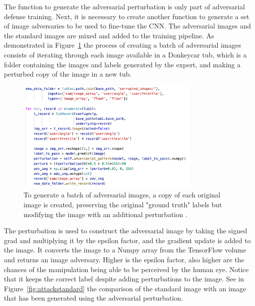 \documentclass[12pt]{article}
\begin{document}
The function to generate the adversarial perturbation is only part of adversarial defense training. Next, it is necessary to create another function to generate a set of image adversaries to be used to fine-tune the CNN. The adversarial images and the standard images are mixed and added to the training pipeline. As demonstrated in Figure~\ref{fig:batchadv} the process of creating a batch of adversarial images consists of iterating through each image available in a Donkeycar tub, which is a folder containing the images and labels generated by the expert, and making a perturbed copy of the image in a new tub.

\begin{figure} [H] %
\begin{center}
\includegraphics[width=0.8\textwidth]{figures/batch-adversarial.png}
\caption{ To generate a batch of adversarial images, a copy of each original image is created, preserving the original "ground truth" labels but modifying the image with an additional perturbation \parencite{Rosebrock}.}
\label{fig:batchadv}
\end{center}
\end{figure}

The perturbation is used to construct the adversarial image by taking the signed grad and multiplying it by the epsilon factor, and the gradient update is added to the image. It converts the image to a Numpy array from the TensorFlow volume and returns an image adversary. Higher is the epsilon factor, also higher are the chances of the manipulation being able to be perceived by the human eye. Notice that it keeps the correct label despite adding perturbations to the image. See in Figure~\ref{fig:attackstandard} the comparison of the standard image with an image that has been generated using the adversarial perturbation.
\end{document}
